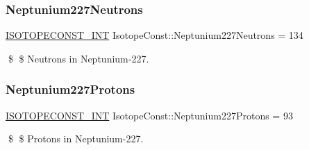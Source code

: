 \subsubsection{\texorpdfstring{Neptunium227\+Neutrons}{Neptunium227Neutrons}}
{\footnotesize\ttfamily \mbox{\hyperlink{group___isotope_const-_macros_ga5f18360b3e99483a35c32d789e62621c}{I\+S\+O\+T\+O\+P\+E\+C\+O\+N\+S\+T\+\_\+\+I\+NT}} Isotope\+Const\+::\+Neptunium227\+Neutrons = 134}

\$ \$ Neutrons in Neptunium-\/227. \mbox{\label{group___isotope_const-_neptunium-_np227_gad88d6009e7dbb930a28fc3cc5fe13db3}} 
\subsubsection{\texorpdfstring{Neptunium227\+Protons}{Neptunium227Protons}}
{\footnotesize\ttfamily \mbox{\hyperlink{group___isotope_const-_macros_ga5f18360b3e99483a35c32d789e62621c}{I\+S\+O\+T\+O\+P\+E\+C\+O\+N\+S\+T\+\_\+\+I\+NT}} Isotope\+Const\+::\+Neptunium227\+Protons = 93}

\$ \$ Protons in Neptunium-\/227. 